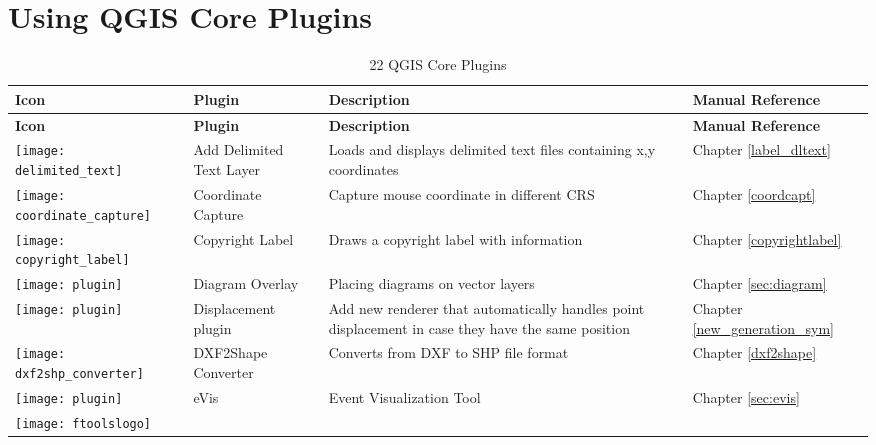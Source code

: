 
\chapter{Using QGIS Core Plugins}\label{sec:core_plugins}



{\setlength{\extrarowheight}{15pt}
\small
\begin{longtable}{|p{1.2cm}|p{3.8cm}|p{7.5cm}|p{3cm}|}
\caption{22 QGIS Core Plugins}\label{tab:core_plugins} \\
\hline
 \textbf{Icon} & \textbf{Plugin} & \textbf{Description} & \textbf{Manual Reference}\\
\endfirsthead
\hline
\textbf{Icon} & \textbf{Plugin} & \textbf{Description} & \textbf{Manual Reference}\\
\endhead
\hline
\texttt{[image: delimited\_text]}
 & Add Delimited Text Layer \index{plugins!delimited text} & Loads and displays delimited text files containing x,y coordinates & Chapter \ref{label_dltext}\\
\hline
\texttt{[image: coordinate\_capture]}
 & Coordinate Capture \index{plugins!coordinate capture}& Capture mouse coordinate in different CRS & Chapter \ref{coordcapt}\\
\hline 
\texttt{[image: copyright\_label]}
 & Copyright Label \index{plugins!copyright}& Draws a copyright label with information & Chapter \ref{copyrightlabel}\\
\hline
\texttt{[image: plugin]}
 & Diagram Overlay \index{plugins!diagram}& Placing diagrams on vector layers & Chapter \ref{sec:diagram}\\
\hline
\texttt{[image: plugin]}
 & Displacement plugin \index{plugins!point displacement}& Add new renderer that automatically handles point displacement in case they have the same position & Chapter \ref{new_generation_sym}\\
\hline
\texttt{[image: dxf2shp\_converter]}
 & DXF2Shape Converter \index{plugins!DXF2Shape}& Converts from DXF to SHP file format & Chapter \ref{dxf2shape}\\
\hline
\texttt{[image: plugin]}
 & eVis & Event Visualization Tool & Chapter \ref{sec:evis}\\
\hline
\texttt{[image: ftoolslogo]}

\end{longtable}}
